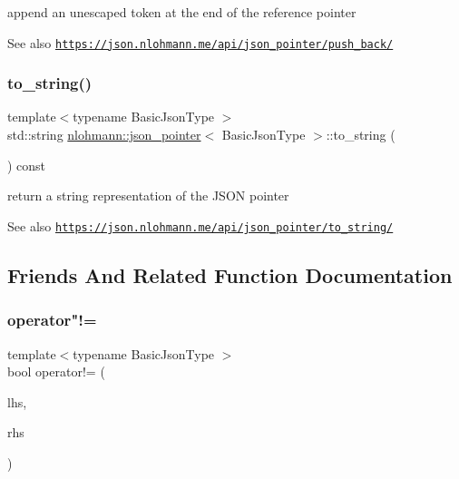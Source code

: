 append an unescaped token at the end of the reference pointer 

\begin{DoxySeeAlso}{See also}
\href{https://json.nlohmann.me/api/json_pointer/push_back/}{\tt https\+://json.\+nlohmann.\+me/api/json\+\_\+pointer/push\+\_\+back/} 
\end{DoxySeeAlso}
\mbox{\label{classnlohmann_1_1json__pointer_a3d4b15d32d096e3776c5d2c773b524f5}} 
\subsubsection{\texorpdfstring{to\+\_\+string()}{to\_string()}}
{\footnotesize\ttfamily template$<$typename Basic\+Json\+Type $>$ \\
std\+::string \hyperlink{classnlohmann_1_1json__pointer}{nlohmann\+::json\+\_\+pointer}$<$ Basic\+Json\+Type $>$\+::to\+\_\+string (\begin{DoxyParamCaption}{ }\end{DoxyParamCaption}) const\hspace{0.3cm}{\ttfamily [inline]}}



return a string representation of the J\+S\+ON pointer 

\begin{DoxySeeAlso}{See also}
\href{https://json.nlohmann.me/api/json_pointer/to_string/}{\tt https\+://json.\+nlohmann.\+me/api/json\+\_\+pointer/to\+\_\+string/} 
\end{DoxySeeAlso}


\subsection{Friends And Related Function Documentation}
\mbox{\label{classnlohmann_1_1json__pointer_a6779edcf28e6f018a3bbb29c0b4b5e1e}} 
\subsubsection{\texorpdfstring{operator"!=}{operator!=}}
{\footnotesize\ttfamily template$<$typename Basic\+Json\+Type $>$ \\
bool operator!= (\begin{DoxyParamCaption}\item[{\hyperlink{classnlohmann_1_1json__pointer}{json\+\_\+pointer}$<$ Basic\+Json\+Type $>$ const \&}]{lhs,  }\item[{\hyperlink{classnlohmann_1_1json__pointer}{json\+\_\+pointer}$<$ Basic\+Json\+Type $>$ const \&}]{rhs }\end{DoxyParamCaption})\hspace{0.3cm}{\ttfamily [friend]}}



